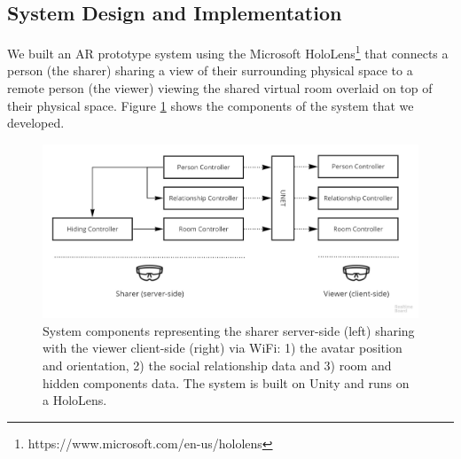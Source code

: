 
\subsection{System Design and Implementation}


We built an AR prototype system using the Microsoft HoloLens\footnote{https://www.microsoft.com/en-us/hololens} that connects a person (the sharer) sharing a view of their surrounding physical space to a remote person (the viewer) viewing the shared virtual room overlaid on top of their physical space. Figure \ref{fig:frontier18:system} shows the components of the system that we developed.

\begin{figure}
    \begin{center}
    \includegraphics[width=\linewidth]{images/54-hiding-frontier18/system.jpg}
    \caption{System components representing the sharer server-side (left) sharing with the viewer client-side (right) via WiFi: 1) the avatar position and orientation, 2) the social relationship data and 3) room and hidden components data. The system is built on Unity and runs on a HoloLens.}
    \label{fig:frontier18:system}
    \end{center}
\end{figure}

